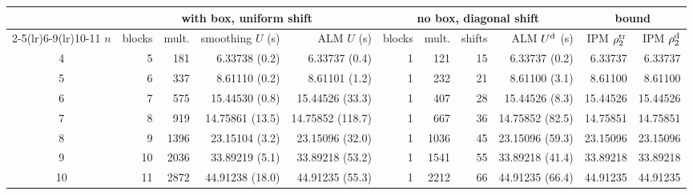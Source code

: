 \begin{tabular}{c r r r r r r r r r r}\toprule
 & \multicolumn{4}{c}{with box, uniform shift} & \multicolumn{4}{c}{no box, diagonal shift} & \multicolumn{2}{c}{bound} \\
\cmidrule(lr){2-5}\cmidrule(lr){6-9}\cmidrule(lr){10-11}
$n$ & blocks & mult. & smoothing $U$ (s) & ALM $U$ (s) & blocks & mult. & shifts & ALM $U^{\rm d}$ (s) & IPM $\rho_2^{\rm tr}$ & IPM $\rho_2^{\rm d}$ \\\midrule
4 & 5 & 181 & 6.33738 (0.2) & 6.33737 (0.4) & 1 & 121 & 15 & 6.33737 (0.2) & 6.33737 & 6.33737 \\
5 & 6 & 337 & 8.61110 (0.2) & 8.61101 (1.2) & 1 & 232 & 21 & 8.61100 (3.1) & 8.61100 & 8.61100 \\
6 & 7 & 575 & 15.44530 (0.8) & 15.44526 (33.3) & 1 & 407 & 28 & 15.44526 (8.3) & 15.44526 & 15.44526 \\
7 & 8 & 919 & 14.75861 (13.5) & 14.75852 (118.7) & 1 & 667 & 36 & 14.75852 (82.5) & 14.75851 & 14.75851 \\
8 & 9 & 1396 & 23.15104 (3.2) & 23.15096 (32.0) & 1 & 1036 & 45 & 23.15096 (59.3) & 23.15096 & 23.15096 \\
9 & 10 & 2036 & 33.89219 (5.1) & 33.89218 (53.2) & 1 & 1541 & 55 & 33.89218 (41.4) & 33.89218 & 33.89218 \\
10 & 11 & 2872 & 44.91238 (18.0) & 44.91235 (55.3) & 1 & 2212 & 66 & 44.91235 (66.4) & 44.91235 & 44.91235 \\
\bottomrule\end{tabular}
